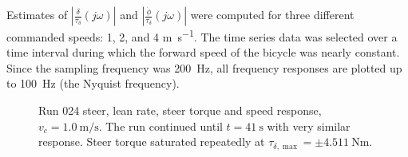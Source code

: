 Estimates of $|\frac{\delta}{\tau_\delta}(j\omega)|$ and
$|\frac{\dot{\phi}}{\tau_\delta}(j\omega)|$ were computed for three different
commanded speeds: 1, 2, and 4 \si{\m\per\s}. The time series data was selected over a
time interval during which the forward speed of the bicycle was nearly
constant. Since the sampling frequency was \SI{200}{\Hz}, all frequency responses are
plotted up to \SI{100}{\Hz} (the Nyquist frequency).
\begin{figure}[htbp]
  \runtwentyfourtime
  \centering
  \caption[Steer, lean rate, steer torque time response at
    \SI{1.0}{\m\per\s}.]{Run 024 steer, lean rate, steer torque and speed
    response, $v_c=\SI{1.0}{\m\per\s}$. The run continued until $t=\SI{41}{\s}$
    with very similar response. Steer torque saturated repeatedly at
    $\tau_{\delta,\max}=\pm\SI{4.511}{\N\m}$.}
  \label{rb:fig:run024_tr}
\end{figure}
